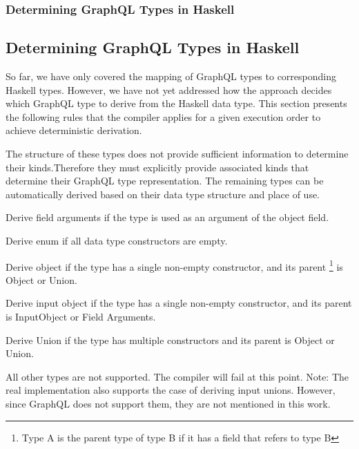 \begin{frame}\frametitle{Determining GraphQL Types in Haskell}
\subsection{Determining GraphQL Types in Haskell}

So far, we have only covered the mapping of GraphQL types to corresponding Haskell types. However, we have not yet addressed how the approach decides which GraphQL type to derive from the Haskell data type.  This section presents the following rules that the compiler applies for a given execution order to achieve deterministic derivation.

\begin{enumerate}
   The structure of these types does not provide sufficient information to determine their kinds.Therefore they must explicitly provide associated kinds that determine their GraphQL type representation. The remaining types can be automatically derived based on their data type structure and place of use.
  
   Derive field arguments if the type is used as an argument of the object field. 

   Derive enum if all data type constructors are empty.

   Derive object if the type has a single non-empty constructor, and its parent \footnote{Type A is the parent type of type B if it has a field that refers to type B} is Object or Union. 
  
   Derive input object if the type has a single non-empty constructor, and its parent is InputObject or Field Arguments.

   Derive Union if the type has multiple constructors and its parent is Object or Union.

   All other types are not supported. The compiler will fail at this point. Note: The real implementation also supports the case of deriving input unions. However, since GraphQL does not support them, they are not mentioned in this work.

\end{enumerate}

\end{frame}

